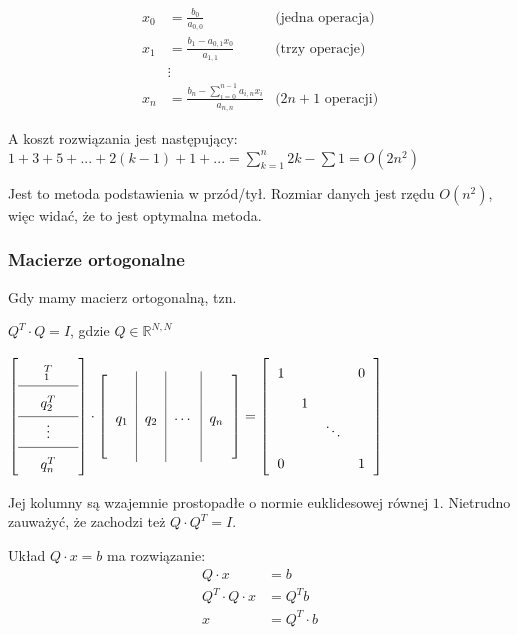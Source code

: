 \documentclass[hidelinks,a4paper,fleqn,oneside]{book}
\newcommand{\RR}{\mathbb{R}}
\newcommand{\eye}{I}
\begin{document}
\begin{align*}
	x_0 & = \frac{b_0}{a_{0,0}}                                & \text{(jedna operacja)}    \\
	x_1 & = \frac{b_1 - a_{0,1} x_0}{a_{1,1}}                  & \text{(trzy operacje)}     \\
	&\vdots \\
	x_n & = \frac{b_n - \sum_{i=0}^{n-1} a_{i,n} x_i}{a_{n,n}} & \text{($2n + 1$ operacji)} 
\end{align*}

A koszt rozwiązania jest następujący:
$1+3+5+...+2(k-1)+1+... = \sum_{k=1}^{n} 2k - \sum 1 = O(2n^2)$

Jest to metoda podstawienia w przód/tył. Rozmiar danych jest rzędu $O(n^2)$, więc widać, że to jest optymalna metoda.

\subsubsection{Macierze ortogonalne}

Gdy mamy macierz ortogonalną, tzn.

$Q^T \cdot Q = I$, gdzie $Q \in \RR^{N, N}$

$\arraycolsep=0.6em\def\arraystretch{1.8}
\left[
	\begin{array}{c}
		\quad _1^T \quad   \\ \hline
		\quad q_2^T \quad  \\ \hline
		\quad \vdots \quad \\ \hline
		\quad q_n^T \quad  
	\end{array}
\right]
\cdot
\left[
	\begin{array}{c|c|c|c}
		    &     &        &     \\
		q_1 & q_2 & \cdots & q_n \\
		    &     &        &     
	\end{array}
\right]
=
\left[
	\begin{array}{cccc}
		1 &   &        & 0 \\
		  & 1 &        &   \\
		  &   & \ddots &   \\
		0 &   &        & 1 
	\end{array}
\right]	
$

Jej kolumny są wzajemnie prostopadłe o normie euklidesowej równej $1$. Nietrudno zauważyć, że zachodzi też $Q \cdot Q^T = \eye$.

Układ $Q \cdot x = b$ ma rozwiązanie:
\begin{equation}
	\begin{aligned}
		Q \cdot x           & = b           \\
		Q^T \cdot Q \cdot x & = Q^T b       \\
		x                   & = Q^T \cdot b \\
	\end{aligned}
\end{equation}
\end{document}
